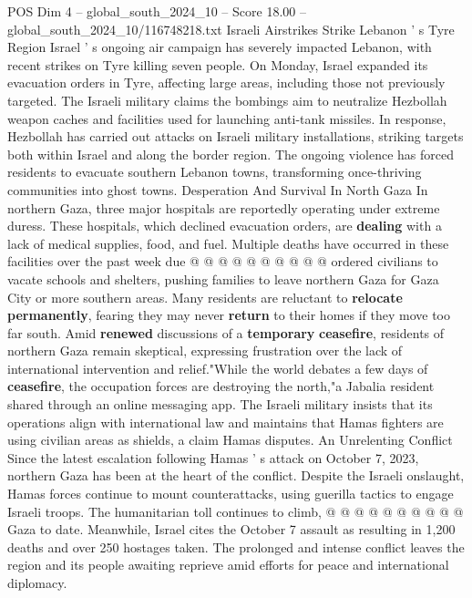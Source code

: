 \begin{textsample}{POS Dim 4 – global\_south\_2024\_10 – Score 18.00 – global\_south\_2024\_10/116748218.txt}
Israeli Airstrikes Strike Lebanon ' s Tyre Region Israel ' s ongoing air campaign has severely impacted Lebanon, with recent strikes on Tyre killing seven people.
On Monday, Israel expanded its evacuation orders in Tyre, affecting large areas, including those not previously targeted.
The Israeli military claims the bombings aim to neutralize Hezbollah weapon caches and facilities used for launching anti-tank missiles.
In response, Hezbollah has carried out attacks on Israeli military installations, striking targets both within Israel and along the border region.
The ongoing violence has forced residents to evacuate southern Lebanon towns, transforming once-thriving communities into ghost towns.
Desperation And Survival In North Gaza In northern Gaza, three major hospitals are reportedly operating under extreme duress.
These hospitals, which declined evacuation orders, are \textbf{dealing} with a lack of medical supplies, food, and fuel.
Multiple deaths have occurred in these facilities over the past week due @ @ @ @ @ @ @ @ @ @ ordered civilians to vacate schools and shelters, pushing families to leave northern Gaza for Gaza City or more southern areas.
Many residents are reluctant to \textbf{relocate} \textbf{permanently}, fearing they may never \textbf{return} to their homes if they move too far south.
Amid \textbf{renewed} discussions of a \textbf{temporary} \textbf{ceasefire}, residents of northern Gaza remain skeptical, expressing frustration over the lack of international intervention and relief."While the world debates a few days of \textbf{ceasefire}, the occupation forces are destroying the north,"a Jabalia resident shared through an online messaging app.
The Israeli military insists that its operations align with international law and maintains that Hamas fighters are using civilian areas as shields, a claim Hamas disputes.
An Unrelenting Conflict Since the latest escalation following Hamas ' s attack on October 7, 2023, northern Gaza has been at the heart of the conflict.
Despite the Israeli onslaught, Hamas forces continue to mount counterattacks, using guerilla tactics to engage Israeli troops.
The humanitarian toll continues to climb, @ @ @ @ @ @ @ @ @ @ Gaza to date.
Meanwhile, Israel cites the October 7 assault as resulting in 1,200 deaths and over 250 hostages taken.
The prolonged and intense conflict leaves the region and its people awaiting reprieve amid efforts for peace and international diplomacy.

\end{textsample}

